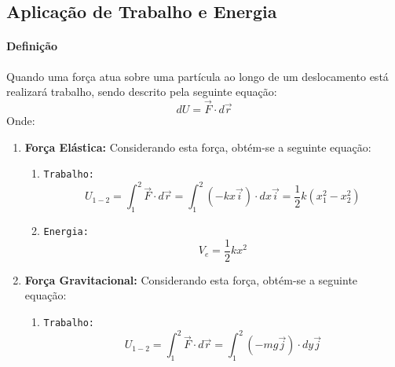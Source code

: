 \documentclass{article}
\begin{document}
        \subsection{Aplicação de Trabalho e Energia}
            \paragraph{Definição}Quando uma força atua sobre uma partícula ao longo de um deslocamento está realizará trabalho, sendo descrito pela seguinte equação:
                \begin{equation}
                    \boxed{dU = \vec{F} \cdot d\vec{r}}
                \end{equation}
            Onde:
                \begin{enumerate}[noitemsep]
                    \item \textbf{Força Elástica:} Considerando esta força, obtém-se a seguinte equação:
                        \begin{enumerate}[noitemsep]
                            \item \texttt{Trabalho:}
                                \[
                                    \boxed{
                                        U_{1-2} = \int_{1}^{2} \vec{F} \cdot d\vec{r}
                                                = \int_{1}^{2} (-kx\vec{i})\cdot dx \vec{i}
                                                = \frac{1}{2} k (x_{1}^2 - x_{2}^2)
                                    }
                                \]
                            \item \texttt{Energia:}
                                \begin{equation}
                                    \boxed{
                                        V_{e} = \frac{1}{2} k x^{2}
                                    }
                                \end{equation}
                        \end{enumerate}
                    \item \textbf{Força Gravitacional:} Considerando esta força, obtém-se a seguinte equação:
                        \begin{enumerate}[noitemsep]
                            \item \texttt{Trabalho:}
                                \[
                                    \boxed{
                                        U_{1-2} = \int_{1}^{2} \vec{F} \cdot d\vec{r}
                                                = \int_{1}^{2} (-mg\vec{j})\cdot dy \vec{j}
}\]
\end{enumerate}
\end{enumerate}
\end{document}
